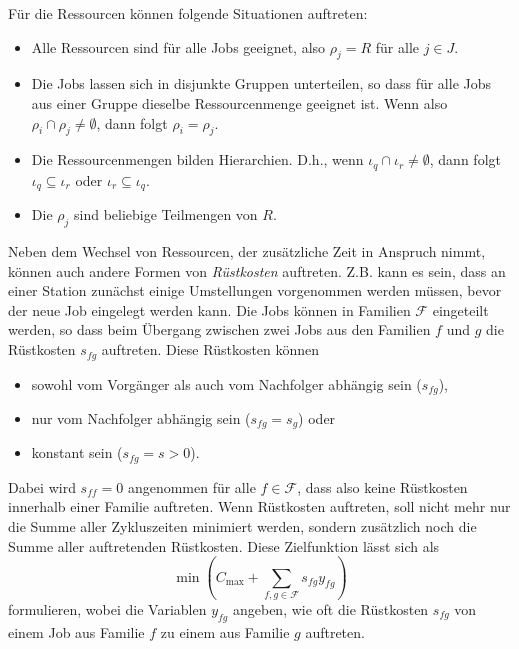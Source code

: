 \documentclass{scrreprt}
\begin{document}
Für die Ressourcen können folgende Situationen auftreten:
\begin{itemize}
    \item Alle Ressourcen sind für alle Jobs geeignet, also $\rho_j=R$ für alle $j\in J$.
    \item Die Jobs lassen sich in disjunkte Gruppen unterteilen, so dass für alle Jobs aus einer Gruppe dieselbe Ressourcenmenge geeignet ist.
        Wenn also $\rho_i \cap \rho_j \neq \emptyset$, dann folgt $\rho_i=\rho_j$.
    \item Die Ressourcenmengen bilden Hierarchien. 
        D.h., wenn $\iota_q \cap \iota_r \neq \emptyset$, dann folgt $\iota_q \subseteq \iota_r$ oder $\iota_r \subseteq \iota_q$.
    \item Die $\rho_j$ sind beliebige Teilmengen von $R$.
\end{itemize}%
Neben dem Wechsel von Ressourcen, der zusätzliche Zeit in Anspruch nimmt, können auch andere Formen von \textit{Rüstkosten}
auftreten. Z.B. kann es sein, dass an einer Station zunächst einige Umstellungen vorgenommen werden müssen, bevor der
neue Job eingelegt werden kann. Die Jobs können in Familien $\mathcal{F}$ eingeteilt werden, so dass beim Übergang
zwischen zwei Jobs aus den Familien $f$ und $g$ die Rüstkosten $s_{fg}$ auftreten.
Diese Rüstkosten können 
\begin{itemize}
    \item sowohl vom Vorgänger als auch vom Nachfolger abhängig sein ($s_{fg}$), 
    \item nur vom Nachfolger abhängig sein ($s_{fg} = s_{g}$) oder
    \item konstant sein ($s_{fg} = s > 0$).
\end{itemize}%
Dabei wird $s_{ff} = 0$ angenommen für alle $f\in\mathcal{F}$, dass also keine Rüstkosten innerhalb einer Familie auftreten.
Wenn Rüstkosten auftreten, soll nicht mehr nur die Summe aller Zykluszeiten minimiert werden, sondern zusätzlich noch die Summe aller auftretenden Rüstkosten.
Diese Zielfunktion lässt sich als 
\[ \min\left(C_{\max}+\sum_{f,g\in\mathcal{F}}s_{fg}y_{fg}\right) \] 
formulieren, wobei die Variablen $y_{fg}$ angeben, wie oft die Rüstkosten $s_{fg}$ von einem Job aus Familie $f$ zu einem aus Familie $g$ auftreten.
\end{document}
